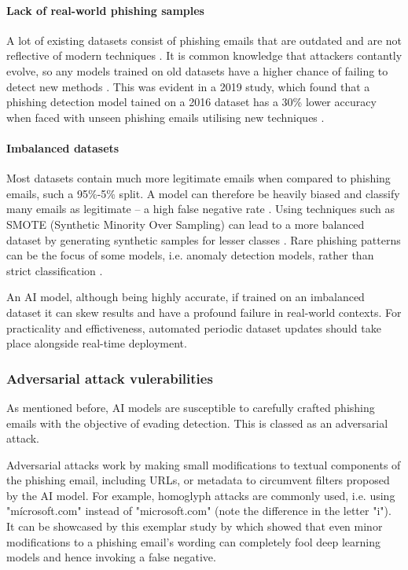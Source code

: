 \paragraph{Lack of real-world phishing samples}
A lot of existing datasets consist of phishing emails that are outdated and are not reflective of modern techniques \citep{bountakas2023helphed}. It is common knowledge that attackers contantly evolve, so any models trained on old datasets have a higher chance of failing to detect new methods \citep{sahoo2017malicious}. This was evident in a 2019 study, which found that a phishing detection model tained on a 2016 dataset has a 30\% lower accuracy when faced with unseen phishing emails utilising new techniques \citep{wang2019pdrcnn}.

\paragraph{Imbalanced datasets}
Most datasets contain much more legitimate emails when compared to phishing emails, such a 95\%-5\% split. A model can therefore be heavily biased and classify many emails as legitimate -- a high false negative rate \citep{qachfar2022leveraging}. Using techniques such as SMOTE (Synthetic Minority Over Sampling) can lead to a more balanced dataset by generating synthetic samples for lesser classes \citep{blagus2013smote}. Rare phishing patterns can be the focus of some models, i.e. anomaly detection models, rather than strict classification \citep{abiodun2019comprehensive}.\newline

\noindent An AI model, although being highly accurate, if trained on an imbalanced dataset it can skew results and have a profound failure in real-world contexts. For practicality and effictiveness, automated periodic dataset updates should take place alongside real-time deployment.

\subsubsection*{Adversarial attack vulerabilities}
As mentioned before, AI models are susceptible to carefully crafted phishing emails with the objective of evading detection. This is classed as an adversarial attack.\newline

\noindent Adversarial attacks work by making small modifications to textual components of the phishing email, including URLs, or metadata to circumvent filters proposed by the AI model. For example, homoglyph attacks are commonly used, i.e. using "m\'{i}crosoft.com" instead of "microsoft.com" (note the difference in the letter "i"). It can be showcased by this exemplar study by \cite{carlini2017adversarial} which showed that even minor modifications to a phishing email's wording can completely fool deep learning models and hence invoking a false negative.\newline

